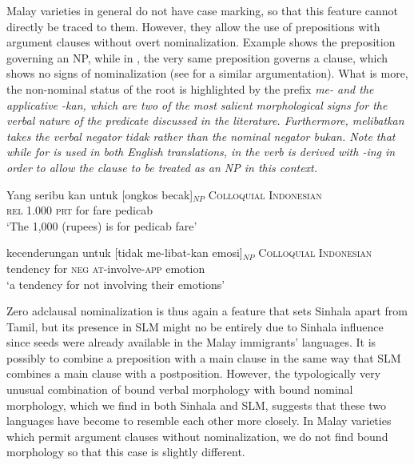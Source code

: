 \documentclass[a4paper,10pt]{article}
\begin{document}
Malay varieties in general do not have case marking, so that this feature cannot directly be traced to them. However, they allow the use of prepositions with argument clauses without overt nominalization. Example  shows the preposition  governing an NP, while in , the very same preposition governs a clause, which shows no signs of nominalization (see \citet[(11,12)]{Gilforthcominglier} for a similar argumentation). What is more, the non-nominal status of the root  is highlighted by the prefix \em me- \em and the applicative \em -kan\em, which are two of the most salient morphological signs for the verbal nature of the predicate discussed in the literature. Furthermore, \em melibatkan \em takes the verbal negator \em tidak \em rather than the nominal negator \em bukan\em.
Note that while \em for \em is used in both English translations, in  the verb is derived with \em -ing \em in order to allow the clause to be treated as an NP in this context. 

\ea \label{ex:nmlz:ind:np}
\gll Yang seribu kan untuk [ongkos becak]$_{NP}$ \textsc{Colloquial Indonesian} \\
     \textsc{rel} 1.000 \textsc{prt} for fare pedicab \\
`The 1,000 (rupees) is for pedicab fare' \citep[142]{Englebretson2003searching}
\z

\ea \label{ex:nmlz:ind:cls}
\gll kecenderungan untuk [tidak me-libat-kan emosi]$_{NP}$  \textsc{Colloquial Indonesian} \\
      tendency for \textsc{neg} \textsc{at}-involve-\textsc{app} emotion\\
`a tendency for not involving their emotions' \citep[142]{Englebretson2003searching}
\z


Zero adclausal nominalization is thus again a feature that sets Sinhala apart from Tamil, but its presence in SLM might no be entirely due to Sinhala influence since seeds were already available in the Malay immigrants' languages. It is possibly to combine a preposition with a main clause in the same way that SLM combines a main clause with a postposition. However, the typologically very unusual combination of bound verbal morphology with bound nominal morphology, which we find in  both Sinhala and SLM, suggests that these two languages have become to resemble each other more closely. In Malay varieties which permit argument clauses without nominalization, we do not find bound morphology so that this case is slightly different.
 
\end{document}

